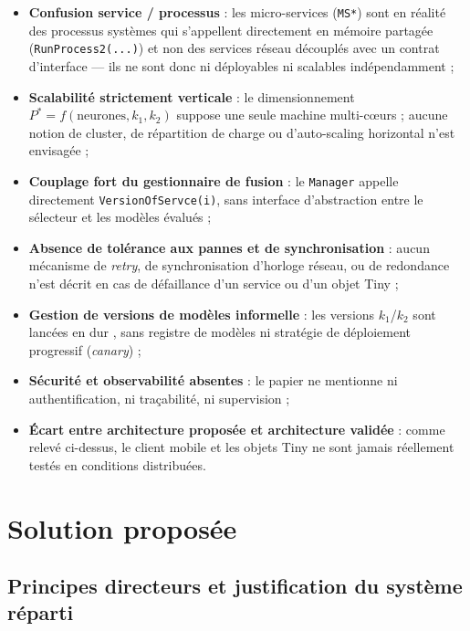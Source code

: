 \documentclass[11pt,a4paper]{article}
\begin{document}
\begin{itemize}
    \item \textbf{Confusion service / processus} : les \og micro-services
    \fg{} (\texttt{MS*}) sont en réalité des processus systèmes qui
    s'appellent directement en mémoire partagée (\texttt{RunProcess2(...)})
    et non des services réseau découplés avec un contrat d'interface ---
    ils ne sont donc ni déployables ni scalables indépendamment ;
    \item \textbf{Scalabilité strictement verticale} : le dimensionnement
    \(P^{*} = f(\text{neurones}, k_1, k_2)\) suppose une seule machine
    multi-cœurs ; aucune notion de cluster, de répartition de charge ou
    d'auto-scaling horizontal n'est envisagée ;
    \item \textbf{Couplage fort du gestionnaire de fusion} : le
    \texttt{Manager} appelle directement \texttt{VersionOfServce(i)}, sans
    interface d'abstraction entre le sélecteur et les modèles évalués ;
    \item \textbf{Absence de tolérance aux pannes et de synchronisation} : aucun mécanisme de
    \emph{retry}, de synchronisation d'horloge réseau, ou de redondance n'est décrit
    en cas de défaillance d'un service ou d'un objet Tiny ;
    \item \textbf{Gestion de versions de modèles informelle} : les
    versions \(k_1\)/\(k_2\) sont lancées \og en dur \fg, sans registre de
    modèles ni stratégie de déploiement progressif (\emph{canary}) ;
    \item \textbf{Sécurité et observabilité absentes} : le papier ne
    mentionne ni authentification, ni traçabilité, ni supervision ;
    \item \textbf{Écart entre architecture proposée et architecture
    validée} : comme relevé ci-dessus, le client mobile et les objets
    Tiny ne sont jamais réellement testés en conditions distribuées.
\end{itemize}

\section{Solution proposée}

\subsection{Principes directeurs et justification du système réparti}
\end{document}
